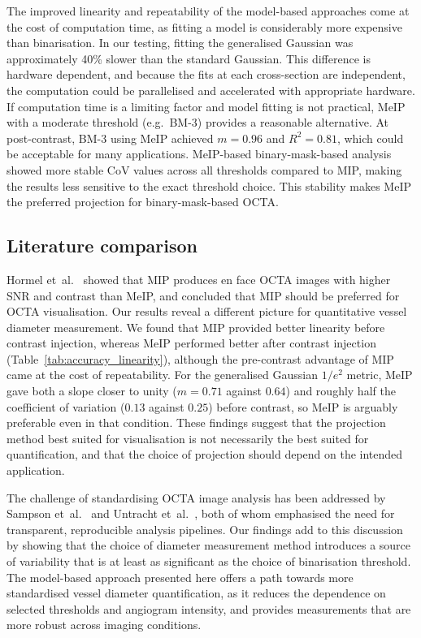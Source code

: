 \documentclass{optica-article}
\begin{document}
The improved linearity and repeatability of the model-based approaches come at the cost of computation time, as fitting a model is considerably more expensive than binarisation. In our testing, fitting the generalised Gaussian was approximately 40\% slower than the standard Gaussian. This difference is hardware dependent, and because the fits at each cross-section are independent, the computation could be parallelised and accelerated with appropriate hardware. If computation time is a limiting factor and model fitting is not practical, MeIP with a moderate threshold (e.g.\ BM-3) provides a reasonable alternative. At post-contrast, BM-3 using MeIP achieved $m = 0.96$ and $R^2 = 0.81$, which could be acceptable for many applications. MeIP-based binary-mask-based analysis showed more stable CoV values across all thresholds compared to MIP, making the results less sensitive to the exact threshold choice. This stability makes MeIP the preferred projection for binary-mask-based OCTA.

\subsection{Literature comparison}
\label{subsec:literature_comparison}
Hormel et~al.~\cite{hormelMaximumValueProjection2018} showed that MIP produces en face OCTA images with higher SNR and contrast than MeIP, and concluded that MIP should be preferred for OCTA visualisation. Our results reveal a different picture for quantitative vessel diameter measurement. We found that MIP provided better linearity before contrast injection, whereas MeIP performed better after contrast injection (Table~\ref{tab:accuracy_linearity}), although the pre-contrast advantage of MIP came at the cost of repeatability. For the generalised Gaussian $1/e^2$ metric, MeIP gave both a slope closer to unity ($m = 0.71$ against $0.64$) and roughly half the coefficient of variation ($0.13$ against $0.25$) before contrast, so MeIP is arguably preferable even in that condition. These findings suggest that the projection method best suited for visualisation is not necessarily the best suited for quantification, and that the choice of projection should depend on the intended application.

The challenge of standardising OCTA image analysis has been addressed by Sampson et~al.~\cite{sampsonTowardsStandardizingRetinal2022} and Untracht et~al.~\cite{untrachtTowardsStandardisingRetinal2024}, both of whom emphasised the need for transparent, reproducible analysis pipelines. Our findings add to this discussion by showing that the choice of diameter measurement method introduces a source of variability that is at least as significant as the choice of binarisation threshold. The model-based approach presented here offers a path towards more standardised vessel diameter quantification, as it reduces the dependence on selected thresholds and angiogram intensity, and provides measurements that are more robust across imaging conditions.
\end{document}
